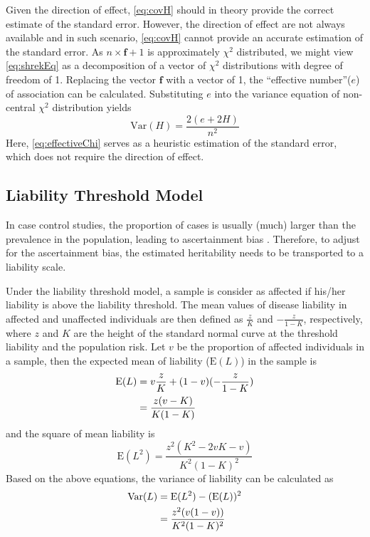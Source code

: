 \documentclass[12pt]{scrbook}
\begin{document}
Given the direction of effect, \cref{eq:covH} should in theory provide the correct estimate of the standard error.
However, the direction of effect are not always available and in such scenario, \cref{eq:covH} cannot provide an accurate estimation of the standard error.
As $n\times \boldsymbol{f}+1$ is approximately $\chi^2$ distributed, we might view \cref{eq:shrekEq} as a decomposition of a vector of $\chi^2$ distributions with degree of freedom of 1. 
Replacing the vector $\boldsymbol{f}$ with a vector of 1, the ``effective number''($e$) of association \citep{Li2011} can be calculated. 
Substituting $e$ into the variance equation of non-central $\chi^2$ distribution yields
\begin{equation}
\mathrm{Var}(H) = \frac{2(e+2H)}{n^2}
\label{eq:effectiveChi}
\end{equation}
Here, \cref{eq:effectiveChi} serves as a heuristic estimation of the standard error, which does not require the direction of effect.

\subsection{Liability Threshold Model}
In case control studies, the proportion of cases is usually (much) larger than the prevalence in the population, leading to ascertainment bias \citep{lee2011estimating}. 
Therefore, to adjust for the ascertainment bias, the estimated heritability needs to be transported to a liability scale. 

Under the liability threshold model, a sample is consider as affected if his/her liability is above the liability threshold.
The mean values of disease liability in affected and unaffected individuals are then defined as $\frac{z}{K}$ and $-\frac{z}{1-K}$, respectively, where $z$ and $K$ are the height of the standard normal curve at the threshold liability and the population risk.
Let $v$ be the proportion of affected individuals in a sample, then the expected mean of liability ($\mathrm{E}(L)$) in the sample is
\begin{align}
\mathrm{E}(L)&=v\frac{z}{K}+(1-v)(-\frac{z}{1-K}) \notag\\
&=\frac{z(v-K)}{K(1-K)}
\end{align}
and the square of mean liability is
\begin{equation}
\mathrm{E}(L^2)=\frac{z^2(K^2-2vK-v)}{K^2(1-K)^2}
\end{equation}
Based on the above equations, the variance of liability can be calculated as
\begin{align}
\mathrm{Var}(L)&=\mathrm{E}(L^2)-(\mathrm{E}(L))^2 \notag\\
&= \frac{z^2(v(1-v))}{K^2(1-K)^2}
\end{align}
\end{document}
